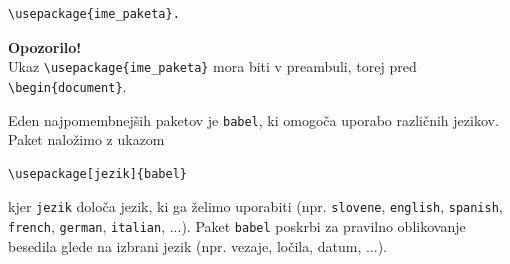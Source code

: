 \begin{verbatim}
\usepackage{ime_paketa}.
\end{verbatim}

\begin{framed}
\textbf{Opozorilo!}\\
Ukaz \texttt{{\textbackslash}usepackage\{ime\_paketa\}} mora biti v preambuli, torej pred \texttt{{\textbackslash}begin\{document\}}.
\end{framed}

Eden najpomembnejših paketov je \texttt{babel}, ki omogoča uporabo različnih jezikov.
Paket naložimo z ukazom

\begin{verbatim}
\usepackage[jezik]{babel}
\end{verbatim}

kjer \texttt{jezik} določa jezik, ki ga želimo uporabiti (npr. \texttt{slovene}, \texttt{english}, \texttt{spanish}, \texttt{french}, \texttt{german}, \texttt{italian}, ...).
Paket \texttt{babel} poskrbi za pravilno oblikovanje besedila glede na izbrani jezik (npr. vezaje, ločila, datum, ...).

